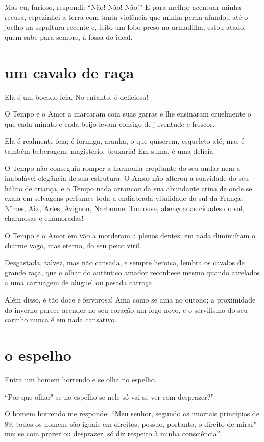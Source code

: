 Mas eu, furioso, respondi: “Não! Não! Não!''
E para melhor acentuar minha recusa, espezinhei a
terra com tanta violência que minha perna afundou até o joelho na sepultura recente e, feito
um lobo preso na armadilha, estou atado, quem sabe para sempre, à fossa
do ideal.

\quebra\section[Um cavalo de raça]{um cavalo de raça}

Ela é um bocado feia. No entanto, é deliciosa!

O Tempo e o Amor a marcaram com suas garras e lhe ensinaram cruelmente o
que cada minuto e cada beijo levam consigo de juventude e frescor.

Ela é realmente feia; é formiga, aranha, o que quiserem, esqueleto até;
mas é também beberagem, magistério, bruxaria! Em suma, é uma delícia.

O Tempo não conseguiu romper a harmonia crepitante do seu andar nem a
inabalável elegância de sua estrutura. O Amor não alterou a suavidade
do seu hálito de criança, e o Tempo nada arrancou da sua abundante
crina de onde se exala em selvagens perfumes toda a
endiabrada vitalidade do sul da França: Nîmes, Aix, Arles, Avignon, Narbonne,
Toulouse, abençoadas cidades do sol, charmosas e enamoradas!

O Tempo e o Amor em vão a morderam a plenos dentes; em nada
diminuíram o charme vago, mas eterno, do seu peito viril.

Desgastada, talvez, mas não cansada, e sempre heroica, lembra os cavalos
de grande raça, que o olhar do autêntico amador reconhece mesmo quando
atrelados a uma carruagem de aluguel ou pesada carroça.

Além disso, é tão doce e fervorosa! Ama como se ama no outono;
a proximidade do inverno parece acender no seu coração um
fogo novo, e o servilismo do seu carinho nunca é em nada cansativo.

\quebra\section[O espelho]{o espelho}

Entra um homem horrendo e se olha no espelho.

“Por que olhar"-se no espelho se nele só vai se
ver com desprazer?''

O homem horrendo me responde: “Meu senhor, segundo os imortais
princípios de 89, todos os homens são iguais em direitos; possuo,
portanto, o direito de mirar"-me; se com prazer ou desprazer, só diz
respeito à minha consciência''.


